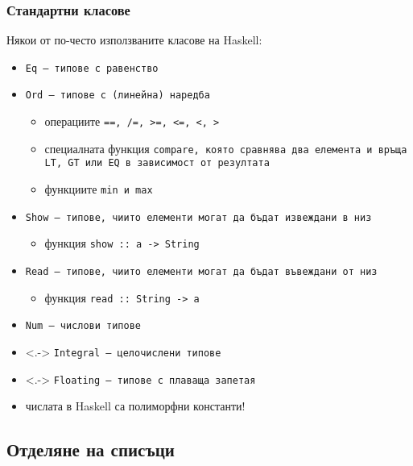 \documentclass{beamer}
\begin{document}
\begin{frame}
  \frametitle{Стандартни класове}
  Някои от по-често използваните класове на Haskell:
  \begin{itemize}[<+->]
  \item \tt{Eq} --- типове с равенство
  \item \tt{Ord} --- типове с (линейна) наредба
    \begin{itemize}[<.->]
    \item операциите \tt{==}, \tt{/=}, \tt{>=}, \tt{<=}, \tt{<}, \tt{>}
    \item специалната функция \tt{compare}, която сравнява два елемента и връща \tt{LT}, \tt{GT} или \tt{EQ} в зависимост от резултата
    \item функциите \tt{min} и \tt{max}
    \end{itemize}
  \item \tt{Show} --- типове, чиито елементи могат да бъдат извеждани в низ
    \begin{itemize}[<.->]
    \item функция \tt{show :: a -> String}
    \end{itemize}
  \item \tt{Read} --- типове, чиито елементи могат да бъдат въвеждани от низ
    \begin{itemize}[<.->]
    \item функция \tt{read :: String -> a}
    \end{itemize}
  \item \tt{Num} --- числови типове
  \item<.-> \tt{Integral} --- целочислени типове
  \item<.-> \tt{Floating} --- типове с плаваща запетая
  \item \alert{числата в Haskell са полиморфни константи!}
  \end{itemize}
\end{frame}

\subsection{Отделяне на списъци}
\end{document}
